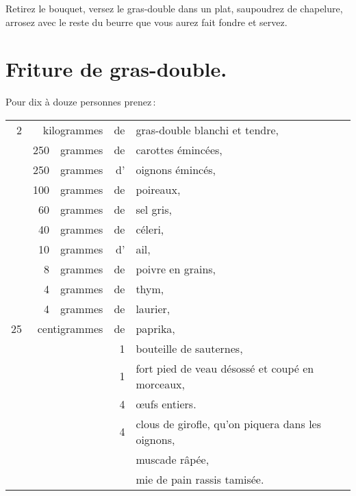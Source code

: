 Retirez le bouquet, versez le gras-double dans un plat, saupoudrez de chapelure,
arrosez avec le reste du beurre que vous aurez fait fondre et servez.

\section*{\centering Friture de gras-double.}

Pour dix à douze personnes prenez :

\medskip

\footnotesize
\begin{longtable}{rrrrp{18em}}
  2 & \multicolumn{2}{r}{kilogrammes} & de & gras-double blanchi et tendre,                               \\
    & 250 & grammes & de & carottes émincées,                                                             \\
    & 250 & grammes & d' & oignons émincés,                                                               \\
    & 100 & grammes & de & poireaux,                                                                      \\
    &  60 & grammes & de & sel gris,                                                                      \\
    &  40 & grammes & de & céleri,                                                                        \\
    &  10 & grammes & d' & ail,                                                                           \\
    &   8 & grammes & de & poivre en grains,                                                              \\
    &   4 & grammes & de & thym,                                                                          \\
    &   4 & grammes & de & laurier,                                                                       \\
 25 &\multicolumn{2}{r}{centigrammes} & de & paprika,                                                     \\
    &     &         &  1 & bouteille de sauternes,                                                        \\
    &     &         &  1 & fort pied de veau désossé et coupé en morceaux,                                \\
    &     &         &  4 & œufs entiers.                                                                  \\
    &     &         &  4 & clous de girofle, qu'on piquera dans les oignons,                              \\
    &     &         &    & muscade râpée,                                                                 \\
    &     &         &    & mie de pain rassis tamisée.                                                    \\
\end{longtable}
\normalsize

